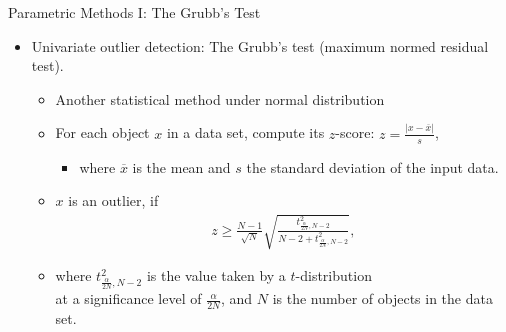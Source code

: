 \begin{frame}{Parametric Methods I: The Grubb's Test}
	\begin{itemize}
		\item Univariate outlier detection: The Grubb's test (maximum normed residual test).
		      \begin{itemize}
			      \item Another statistical method under normal distribution
			      \item For each object $x$ in a data set, compute its $z$-score:  $z = \frac{\vert x - \overline{x}\vert}{s}$,
			            \begin{itemize}
				            \item where $\overline{x}$ is the mean and $s$ the standard deviation of the input data.
			            \end{itemize}
			      \item $x$ is an outlier, if
			            \begin{align}
				            z \geq \frac{N-1}{\sqrt{N}} \sqrt{\frac{t^2_{\frac{\alpha}{2N},N-2}}{N-2 + t^2_{\frac{\alpha}{2N},N-2}}},
			            \end{align}
		      \end{itemize}
		      \begin{itemize}
			      \item where $t^2_{\frac{\alpha}{2N},N-2}$ is the value taken by a $t$-distribution \\
			            at a significance level of $\frac{\alpha}{2N}$, and $N$ is the number of objects in the data set.
		      \end{itemize}
	\end{itemize}
\end{frame}


